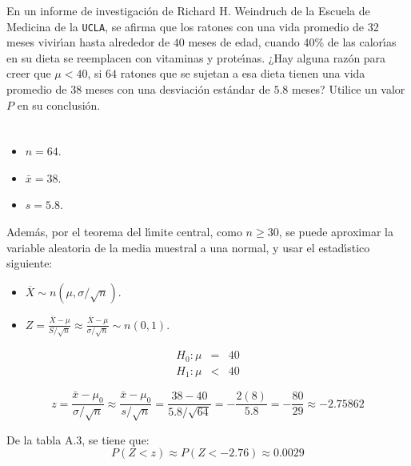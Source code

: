 \begin{enunciado}
 En un informe de investigaci\'on de Richard H. Weindruch de la Escuela de Medicina de la \texttt{UCLA}, se afirma que los ratones con una vida promedio de 32 meses vivir\'{\i}an hasta alrededor de $40$ meses de edad, cuando 40\% de las calor\'{\i}as en su dieta se reemplacen con vitaminas y prote\'{\i}nas. ¿Hay alguna raz\'on para creer que $\mu < 40$, si $64$ ratones que se sujetan a esa dieta tienen una vida promedio de $38$ meses con una desviaci\'on est\'andar de $5.8$ meses? Utilice un valor $P$ en su conclusi\'on.
\end{enunciado}

\begin{solucion}
 \begin{datos}
  $\phantom{0}$
  \begin{itemize}
   \item $n = 64$.
   \item $\bar{x} = 38$.
   \item $s = 5.8$.
  \end{itemize}
  Adem\'as, por el teorema del l\'{\i}mite central, como $n \geq 30$, se puede aproximar la variable aleatoria de la media muestral a una normal, y usar el estad\'{\i}stico siguiente:
  \begin{itemize}
   \item $\overline{X} \sim n\left( \mu , \sigma/\sqrt{n} \right)$.
   \item $Z = \frac{\overline{X}-\mu}{S/\sqrt{n}} \approx
   \frac{\overline{X} - \mu}{\sigma/\sqrt{n}} \sim n(0,1)$.
  \end{itemize}
 \end{datos}

 \begin{hipotesis}
  \begin{eqnarray*}
   H_0: \mu & = & 40 \\
   H_1: \mu & < & 40
  \end{eqnarray*}
 \end{hipotesis}

 \begin{estadistico}
  \begin{equation*}
   z = \frac{\bar{x}-\mu_0}{\sigma/\sqrt{n}} \approx \frac{\bar{x} - \mu_0}{s/\sqrt{n}} = \frac{38-40}{5.8/\sqrt{64}} = -\frac{2(8)}{5.8} = -\frac{80}{29} \approx -2.75862
  \end{equation*}
 \end{estadistico}

 \begin{valorp}
  De la tabla A.3, se tiene que:
  \begin{equation*}
   P(Z<z) \approx P(Z < -2.76) \approx 0.0029
  \end{equation*}
 \end{valorp}


\end{solucion}

